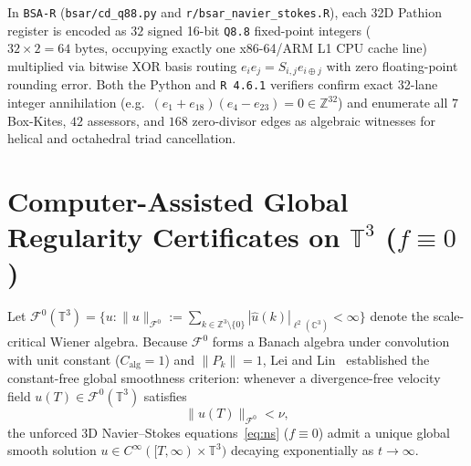 \documentclass[11pt]{article}
\theoremstyle{plain}
\theoremstyle{definition}
\begin{document}
In \texttt{BSA-R} (\texttt{bsar/cd\_q88.py} and \texttt{r/bsar\_navier\_stokes.R}), each 32D Pathion register is encoded as $32$ signed 16-bit \texttt{Q8.8} fixed-point integers ($32 \times 2 = 64\text{ bytes}$, occupying exactly one x86-64/ARM L1 CPU cache line) multiplied via bitwise XOR basis routing $e_i e_j = S_{i,j} e_{i \oplus j}$ with zero floating-point rounding error. Both the Python and \texttt{R 4.6.1} verifiers confirm exact 32-lane integer annihilation (e.g.\ $(e_1 + e_{18})(e_4 - e_{23}) = 0 \in \mathbb{Z}^{32}$) and enumerate all $7$ Box-Kites, $42$ assessors, and $168$ zero-divisor edges as algebraic witnesses for helical and octahedral triad cancellation.

\section{Computer-Assisted Global Regularity Certificates on $\mathbb{T}^3$ ($f \equiv 0$)}\label{sec:fourier3d}

Let $\mathcal{F}^0(\mathbb{T}^3) = \{u : \|u\|_{\mathcal{F}^0} := \sum_{k \in \mathbb{Z}^3 \setminus \{0\}} |\hat{u}(k)|_{\ell^2(\mathbb{C}^3)} < \infty\}$ denote the scale-critical Wiener algebra. Because $\mathcal{F}^0$ forms a Banach algebra under convolution with unit constant ($C_{\mathrm{alg}} = 1$) and $\|P_k\| = 1$, Lei and Lin~\cite{leilin2011} established the constant-free global smoothness criterion: whenever a divergence-free velocity field $u(T) \in \mathcal{F}^0(\mathbb{T}^3)$ satisfies
\begin{equation}\label{eq:leilin}
  \|u(T)\|_{\mathcal{F}^0} < \nu,
\end{equation}
the unforced 3D Navier--Stokes equations~\eqref{eq:ns} ($f \equiv 0$) admit a unique global smooth solution $u \in C^\infty([T,\infty) \times \mathbb{T}^3)$ decaying exponentially as $t \to \infty$.
\end{document}
